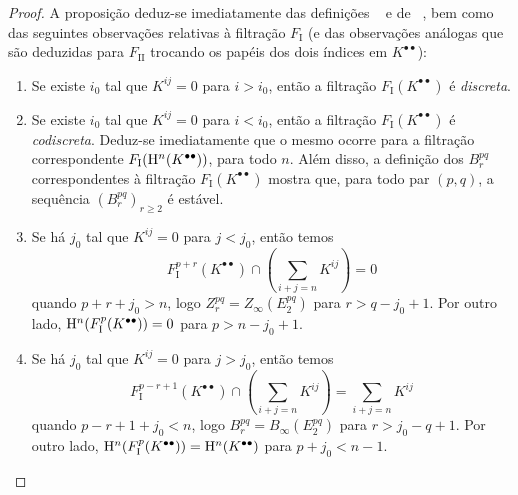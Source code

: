 \begin{proof}
A proposição deduz-se imediatamente das definições ~ e de ~, bem como das seguintes observações relativas à filtração $F_\mathrm{I}$ (e das observações análogas que são deduzidas para $F_\mathrm{II}$ trocando os papéis dos dois índices em $K^{\bullet\bullet}$):
\begin{enumerate}
  \item[{$1^{\circ}$}] Se existe $i_0$ tal que $K^{ij}=0$ para $i>i_0$, então a filtração $F_\mathrm{I}(K^{\bullet\bullet})$ é \emph{discreta}.
    \item[{$2^{\circ}$}] Se existe $i_0$ tal que $K^{ij}=0$ para $i<i_0$, então a filtração $F_\mathrm{I}(K^{\bullet\bullet})$ é \emph{codiscreta}.
    Deduz-se imediatamente que o mesmo ocorre para a filtração correspondente $F_\mathrm{I}(\mathrm{H}^n(K^{\bullet\bullet}))$, para todo $n$.
    Além disso, a definição dos $B_{r}^{pq}$ correspondentes à filtração $F_\mathrm{I}(K^{\bullet\bullet})$  mostra que, para todo par $(p,q)$, a sequência $(B_{r}^{pq})_{r\geq 2}$ é estável.
  \item[{$3^{\circ}$}] Se há $j_0$ tal que $K^{ij}=0$ para $j<j_0$, então temos
    \[
      F_\mathrm{I}^{p+r}(K^{\bullet\bullet})
      \cap (\sum_{i+j=n}K^{ij})
      = 0
    \]
    quando $p+r+j_{0}>n$, logo $Z_{r}^{pq} = Z_\infty(E_2^{pq})$ para $r>q-j_{0}+1$.
    Por outro lado, $\mathrm{H}^{n}(F_\mathrm{I}^{p}(K^{\bullet\bullet})) = 0$ para $p>n-j_{0}+1$.
  \item[{$4^{\circ}$}] Se há $j_0$ tal que $K^{ij}=0$ para $j>j_0$, então temos
    \[
      F_\mathrm{I}^{p-r+1}(K^{\bullet\bullet})
      \cap (\sum_{i+j=n}K^{ij})
      = \sum_{i+j=n}K^{ij}
    \]
    quando $p-r+1+j_{0}<n$, logo $B_{r}^{pq} = B_\infty(E_2^{pq})$ para $r>j_{0}-q+1$.
    Por outro lado, $\mathrm{H}^{n}(F_\mathrm{I}^{p}(K^{\bullet\bullet})) = \mathrm{H}^{n}(K^{\bullet\bullet})$ para $p+j_{0}<n-1$.
\end{enumerate}
\end{proof}


